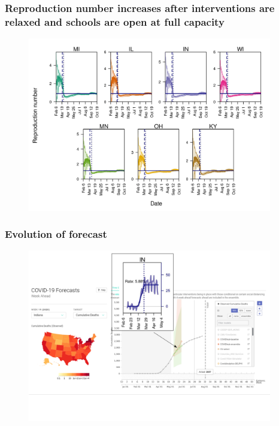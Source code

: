\documentclass[usenames,dvipsnames]{beamer}
\begin{document}
\begin{frame}
  \frametitle{Reproduction number increases after interventions are relaxed and schools are open at full capacity}
    \begin{figure}
    \includegraphics[width=0.95\textwidth]{../figures/report_figure_reproduction_number.jpeg}
  \end{figure}
\end{frame}

\begin{frame}
  \frametitle{Evolution of forecast}
    \begin{figure}
    \includegraphics[width=0.95\textwidth]{./images/FRED_forecast_up_1.png}
  \end{figure}
\end{frame}
\end{document}
